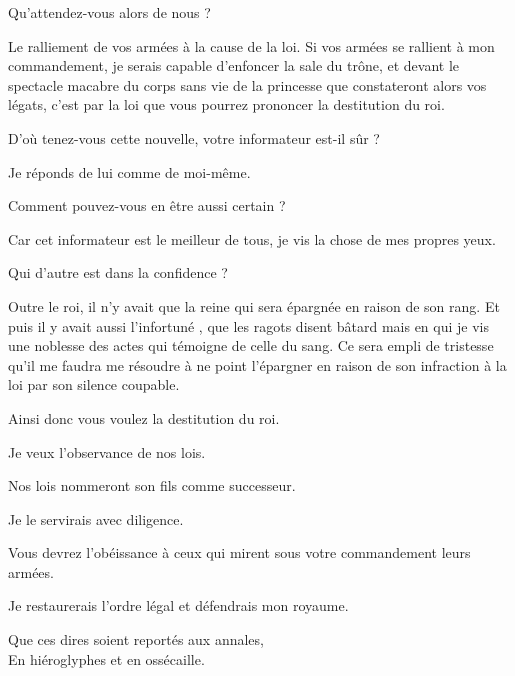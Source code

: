 \begin{drama}
  \nobleOnespeaks Qu’attendez-vous alors de nous ?

  \generalspeaks Le ralliement de vos armées à la cause de la loi. Si vos armées se rallient à mon commandement, je serais capable d’enfoncer la sale du trône, et devant le spectacle macabre du corps sans vie de la princesse que constateront alors vos légats, c’est par la loi que vous pourrez prononcer la destitution du roi.

  \nobleOnespeaks D’où tenez-vous cette nouvelle, votre informateur est-il sûr ?

  \generalspeaks Je réponds de lui comme de moi-même.

  \nobleTwospeaks Comment pouvez-vous en être aussi certain ?

  \generalspeaks Car cet informateur est le meilleur de tous, je vis la chose de mes propres yeux.

  \nobleOnespeaks Qui d’autre est dans la confidence ?

  \generalspeaks Outre le roi, il n’y avait que la reine qui sera épargnée en raison de son rang. Et puis il y avait aussi l’infortuné \elena{}, que les ragots disent bâtard mais en qui je vis une noblesse des actes qui témoigne de celle du sang. Ce sera empli de tristesse qu’il me faudra me résoudre à  ne point l’épargner en raison de son infraction à la loi par son silence coupable.

  \nobleOnespeaks Ainsi donc vous voulez la destitution du roi.

  \generalspeaks Je veux l’observance de nos lois.

  \nobleTwospeaks Nos lois nommeront son fils comme successeur.

  \generalspeaks Je le servirais avec diligence.

  \nobleTreespeaks Vous devrez l’obéissance à ceux qui mirent sous votre commandement leurs armées.

  \generalspeaks Je restaurerais l’ordre légal et défendrais mon royaume.

  \begin{minipage}[t]{\linewidth}
    Que ces dires soient reportés aux annales,\\
    En hiéroglyphes et en ossécaille.
  \end{minipage}

\end{drama}

\scene

\StageDirII{\elena, \vladimir}

